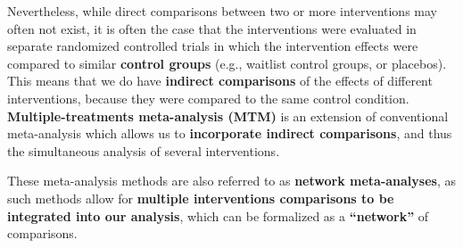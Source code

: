 \documentclass[]{book}
\begin{document}
Nevertheless, while direct comparisons between two or more interventions may often not exist, it is often the case that the interventions were evaluated in separate randomized controlled trials in which the intervention effects were compared to similar \textbf{control groups} (e.g., waitlist control groups, or placebos). This means that we do have \textbf{indirect comparisons} of the effects of different interventions, because they were compared to the same control condition. \textbf{Multiple-treatments meta-analysis (MTM)} is an extension of conventional meta-analysis which allows us to \textbf{incorporate indirect comparisons}, and thus the simultaneous analysis of several interventions.

These meta-analysis methods are also referred to as \textbf{network meta-analyses}, as such methods allow for \textbf{multiple interventions comparisons to be integrated into our analysis}, which can be formalized as a \textbf{``network''} of comparisons.
\end{document}
